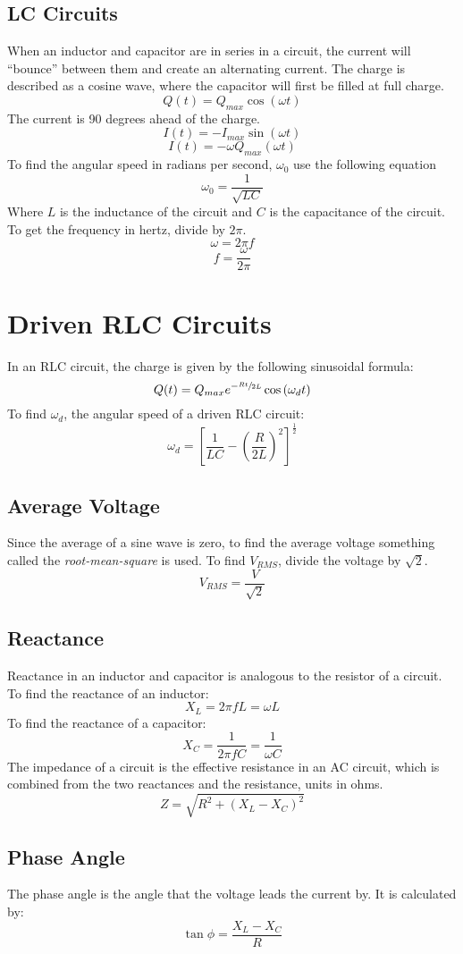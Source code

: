 \documentclass{article}
\begin{document}
\subsection{LC Circuits}
When an inductor and capacitor are in series in a circuit, the current will ``bounce'' between them and create an alternating current.  The charge is described as a cosine wave, where the capacitor will first be filled at full charge.
\[Q(t)=Q_{max}\cos(\omega t)\]
The current is 90 degrees ahead of the charge.
\[I(t) = -I_{max}\sin(\omega t) \]
\[I(t) = -\omega Q_{max}(\omega t)\]
To find the angular speed in radians per second, $\omega_0$ use the following equation
\[\omega_0 = \frac{1}{\sqrt{LC}}\]
Where $L$ is the inductance of the circuit and $C$ is the capacitance of the circuit. To get the frequency in hertz, divide by $2\pi$.
\[\omega=2\pi f\]
\[f = \frac{\omega}{2\pi}\]
\section{Driven RLC Circuits}
In an RLC circuit, the charge is given by the following sinusoidal formula:
\[Q(t)=Q_{max}e^{-\sfrac{Rt}{2L}}\cos\left(\omega_dt\right)\]
To find $\omega_d$, the angular speed of a driven RLC circuit:
\[\omega_d=\left[ \frac{1}{LC} - \left(\frac{R}{2L}\right)^2 \right]^\frac{1}{2}\]
\subsection{Average Voltage}
Since the average of a sine wave is zero, to find the average voltage something called the \textit{root-mean-square} is used.  To find $V_{RMS}$, divide the voltage by $\sqrt{2}$.
\[V_{RMS}=\frac{V}{\sqrt{2}}\]
\subsection{Reactance}
Reactance in an inductor and capacitor is analogous to the resistor of a circuit. To find the reactance of an inductor:
\[X_L = 2\pi fL = \omega L\]
To find the reactance of a capacitor:
\[X_C = \frac{1}{2\pi fC} = \frac{1}{\omega C}\]
The impedance of a circuit is the effective resistance in an AC circuit, which is combined from the two reactances and the resistance, units in ohms.
\[Z=\sqrt{R^2+\left(X_L-X_C\right)^2}\]
\subsection{Phase Angle}
The phase angle is the angle that the voltage leads the current by.  It is calculated by:
\[ \tan\phi = \frac{X_L - X_C}{R} \]
\end{document}
